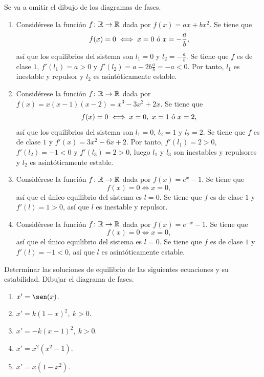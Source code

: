 \documentclass[11pt]{report}
\begin{document}
\begin{solution}
    Se va a omitir el dibujo de los diagramas de fases.
    \begin{enumerate}
        \item Considérese la función $f \colon \mathbb R \to \mathbb R$ dada por $f(x) = ax+bx^2$. Se tiene que
        \[f(x) = 0 \iff x = 0 \textup{ ó } x = -\frac{a}{b},\]
        así que los equilibrios del sistema son $l_1 = 0$ y $l_2 = -\frac{a}{b}$. Se tiene que $f$ es de clase $1$, $f'(l_1) = a>0 $ y $f'(l_2) = a-2b\frac{a}{b} = -a < 0$. Por tanto, $l_1$ es inestable y repulsor y $l_2$ es asintóticamente estable.
        \item Considérese la función $f \colon \mathbb R \to \mathbb R$ dada por $f(x) = x(x-1)(x-2) = x^3-3x^2+2x$. Se tiene que
        \[f(x) = 0 \iff x = 0, \ x = 1 \textup{ ó } x = 2,\]
        así que los equilibrios del sistema son $l_1 = 0$, $l_2 = 1$ y $l_2 = 2$. Se tiene que $f$ es de clase $1$ y $f'(x) = 3x^2-6x+2$. Por tanto, $f'(l_1) = 2 > 0$, $f'(l_2) = -1 < 0$ y $f'(l_3) = 2 > 0$, luego $l_1$ y $l_3$ son inestables y repulsores y $l_2$ es asintóticamente estable.
        \item Considérese la función $f \colon \mathbb R \to \mathbb R$ dada por $f(x) = e^x-1$. Se tiene que
        \[f(x) = 0 \iff x = 0,\]
        así que el único equilibrio del sistema es $l = 0$. Se tiene que $f$ es de clase $1$ y $f'(l) = 1 > 0$, así que $l$ es inestable y repulsor.
        \item Considérese la función $f \colon \mathbb R \to \mathbb R$ dada por $f(x) = e^{-x}-1$. Se tiene que
        \[f(x) = 0 \iff x = 0,\]
        así que el único equilibrio del sistema es $l = 0$. Se tiene que $f$ es de clase $1$ y $f'(l) = -1 < 0$, así que $l$ es asintóticamente estable.
    \end{enumerate}
\end{solution}

\begin{exercise}
    Determinar las soluciones de equilibrio de las siguientes ecuaciones y su estabilidad. Dibujar el diagrama de fases.
    \begin{enumerate}
        \item $x' = \sen(x)$.
        \item $x' = k(1-x)^2, \ k > 0$.
        \item $x' = -k(x-1)^2, \ k > 0$.
        \item $x' = x^2(x^2-1)$.
        \item $x' = x(1-x^2)$.
    \end{enumerate}
\end{exercise}
\end{document}

